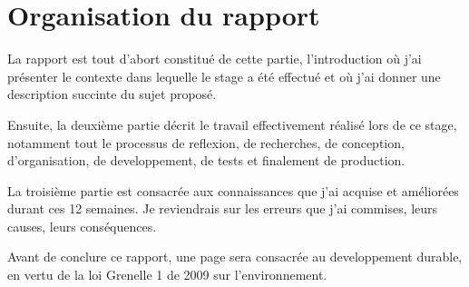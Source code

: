\section{Organisation du rapport}

La rapport est tout d'abort constitué de cette partie, l'introduction où j'ai présenter le contexte dans lequelle le stage a été effectué et où j'ai donner une description succinte du sujet proposé.

Ensuite, la deuxième partie décrit le travail effectivement réalisé lors de ce stage, notamment tout le processus de reflexion, de recherches, de conception, d'organisation, de developpement, de tests et finalement de production.

La troisième partie est consacrée aux connaissances que j'ai acquise et améliorées durant ces 12 semaines. Je reviendrais sur les erreurs que j'ai commises, leurs causes, leurs conséquences.

Avant de conclure ce rapport, une page sera consacrée au developpement durable, en vertu de la loi Grenelle 1 de 2009 sur l'environnement.





















%

